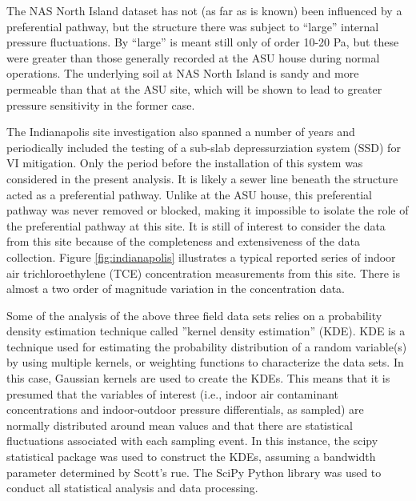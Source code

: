 \documentclass[journal=esthag,manuscript=article]{achemso}
\begin{document}
The NAS North Island dataset has not (as far as is known) been influenced by a preferential pathway, but the structure there was subject to “large” internal pressure fluctuations.
By “large” is meant still only of order 10-20 Pa, but these were greater than those generally recorded at the ASU house during normal operations.
The underlying soil at NAS North Island is sandy\cite{hosangadi_high-frequency_2017} and more permeable than that at the ASU site, which will be shown to lead to greater pressure sensitivity in the former case.\par

The Indianapolis site investigation also spanned a number of years and periodically included the testing of a sub-slab depressurziation system (SSD) for VI mitigation.
Only the period before the installation of this system was considered in the present analysis.
It is likely a sewer line beneath the structure acted as a preferential pathway\cite{mchugh_evidence_2017}.
Unlike at the ASU house, this preferential pathway was never removed or blocked, making it impossible to isolate the role of the preferential pathway at this site.
It is still of interest to consider the data from this site because of the completeness and extensiveness of the data collection.
Figure \ref{fig:indianapolis} illustrates a typical reported series of indoor air trichloroethylene (TCE) concentration measurements from this site.
There is almost a two order of magnitude variation in the concentration data.\par

Some of the analysis of the above three field data sets relies on a probability density estimation technique called ”kernel density estimation” (KDE).
KDE is a technique used for estimating the probability distribution of a random variable(s) by using multiple kernels, or weighting functions to characterize the data sets.
In this case, Gaussian kernels are used to create the KDEs.
This means that it is presumed that the variables of interest (i.e., indoor air contaminant concentrations and indoor-outdoor pressure differentials, as sampled) are normally distributed around mean values and that there are statistical fluctuations associated with each sampling event.
In this instance, the scipy statistical package was used to construct the KDEs, assuming a bandwidth parameter determined by Scott’s rue.
The SciPy Python library was used to conduct all statistical analysis and data processing\cite{jones_scipy_2011}.\par
\end{document}

